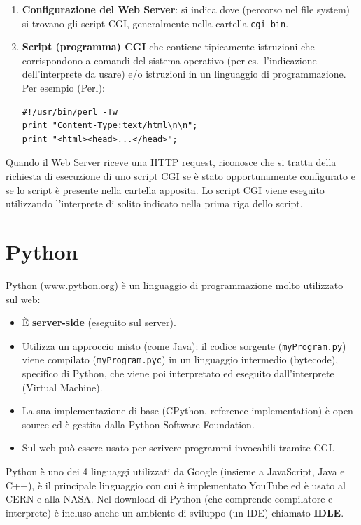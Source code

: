 \begin{enumerate}
    \item \textbf{Configurazione del Web Server}: si indica dove (percorso nel file system) si trovano gli script CGI, generalmente nella cartella \texttt{cgi-bin}.
    \item \textbf{Script (programma) CGI} che contiene tipicamente istruzioni che corrispondono a comandi del sistema operativo (per es.\ l'indicazione dell'interprete da usare) e/o istruzioni in un linguaggio di programmazione. Per esempio (Perl):
\begin{lstlisting}
#!/usr/bin/perl -Tw
print "Content-Type:text/html\n\n";
print "<html><head>...</head>";
\end{lstlisting}
\end{enumerate}

Quando il Web Server riceve una HTTP request, riconosce che si tratta della richiesta di esecuzione di uno script CGI se è stato opportunamente configurato e se lo script è presente nella cartella apposita. Lo script CGI viene eseguito utilizzando l'interprete di solito indicato nella prima riga dello script.

\section{Python}

Python (\url{www.python.org}) è un linguaggio di programmazione molto utilizzato sul web:

\begin{itemize}
    \item È \textbf{server-side} (eseguito sul server).
    \item Utilizza un approccio misto (come Java): il codice sorgente (\texttt{myProgram.py}) viene compilato (\texttt{myProgram.pyc}) in un linguaggio intermedio (bytecode), specifico di Python, che viene poi interpretato ed eseguito dall'interprete (Virtual Machine).
    \item La sua implementazione di base (CPython, reference implementation) è open source ed è gestita dalla Python Software Foundation.
    \item Sul web può essere usato per scrivere programmi invocabili tramite CGI.
\end{itemize}

Python è uno dei 4 linguaggi utilizzati da Google (insieme a JavaScript, Java e C++), è il principale linguaggio con cui è implementato YouTube ed è usato al CERN e alla NASA. Nel download di Python (che comprende compilatore e interprete) è incluso anche un ambiente di sviluppo (un IDE) chiamato \textbf{IDLE}.

